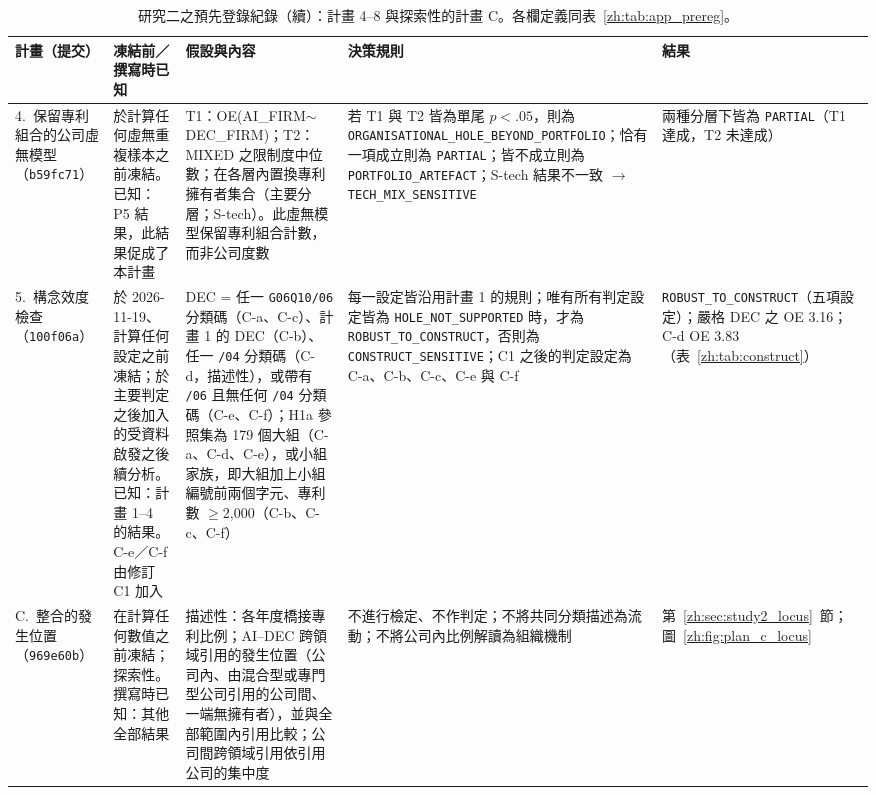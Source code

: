 \begin{table}[tbp]
\centering
\caption{研究二之預先登錄紀錄（續）：計畫 4--8 與探索性的計畫 C。各欄定義同表~\ref{zh:tab:app_prereg}。}
\label{zh:tab:app_prereg_b}
\footnotesize
\setlength{\tabcolsep}{4pt}
\begin{tabular}{p{2.0cm}p{2.5cm}p{3.7cm}p{4.3cm}p{2.3cm}}
\toprule
計畫（提交） & 凍結前／撰寫時已知 & 假設與內容 & 決策規則 & 結果 \tabularnewline
\midrule
\raggedright 4.~保留專利組合的公司虛無模型（\texttt{b59fc71}） &
\raggedright 於計算任何虛無重複樣本之前凍結。已知：P5 結果，此結果促成了本計畫 &
\raggedright T1：OE(AI\_FIRM$\sim$DEC\_FIRM)；T2：MIXED 之限制度中位數；在各層內置換專利擁有者集合（主要分層；S-tech）。此虛無模型保留專利組合計數，而非公司度數 &
\raggedright 若 T1 與 T2 皆為單尾 $p<.05$，則為 \texttt{ORGANISATIONAL\_\allowbreak HOLE\_\allowbreak BEYOND\_\allowbreak PORTFOLIO}；恰有一項成立則為 \texttt{PARTIAL}；皆不成立則為 \texttt{PORTFOLIO\_\allowbreak ARTEFACT}；S-tech 結果不一致 $\rightarrow$ \texttt{TECH\_\allowbreak MIX\_\allowbreak SENSITIVE} &
\raggedright 兩種分層下皆為 \texttt{PARTIAL}（T1 達成，T2 未達成） \tabularnewline
\addlinespace
\raggedright 5.~構念效度檢查（\texttt{100f06a}） &
\raggedright 於 2026-11-19、計算任何設定之前凍結；於主要判定之後加入的受資料啟發之後續分析。已知：計畫 1--4 的結果。C-e／C-f 由修訂 C1 加入 &
\raggedright DEC = 任一 \texttt{G06Q10/06} 分類碼（C-a、C-c）、計畫 1 的 DEC（C-b）、任一 \texttt{/04} 分類碼（C-d，描述性），或帶有 \texttt{/06} 且無任何 \texttt{/04} 分類碼（C-e、C-f）；H1a 參照集為 179 個大組（C-a、C-d、C-e），或小組家族，即大組加上小組編號前兩個字元、專利數 $\geq$2,000（C-b、C-c、C-f） &
\raggedright 每一設定皆沿用計畫 1 的規則；唯有所有判定設定皆為 \texttt{HOLE\_\allowbreak NOT\_\allowbreak SUPPORTED} 時，才為 \texttt{ROBUST\_\allowbreak TO\_\allowbreak CONSTRUCT}，否則為 \texttt{CONSTRUCT\_\allowbreak SENSITIVE}；C1 之後的判定設定為 C-a、C-b、C-c、C-e 與 C-f &
\raggedright \texttt{ROBUST\_\allowbreak TO\_\allowbreak CONSTRUCT}（五項設定）；嚴格 DEC 之 OE 3.16；C-d OE 3.83（表~\ref{zh:tab:construct}） \tabularnewline
\addlinespace
\raggedright C.~整合的發生位置（\texttt{969e60b}） &
\raggedright 在計算任何數值之前凍結；探索性。撰寫時已知：其他全部結果 &
\raggedright 描述性：各年度橋接專利比例；AI--DEC 跨領域引用的發生位置（公司內、由混合型或專門型公司引用的公司間、一端無擁有者），並與全部範圍內引用比較；公司間跨領域引用依引用公司的集中度 &
\raggedright 不進行檢定、不作判定；不將共同分類描述為流動；不將公司內比例解讀為組織機制 &
\raggedright 第~\ref{zh:sec:study2_locus}~節；圖~\ref{zh:fig:plan_c_locus} \tabularnewline

\end{tabular}
\end{table}
